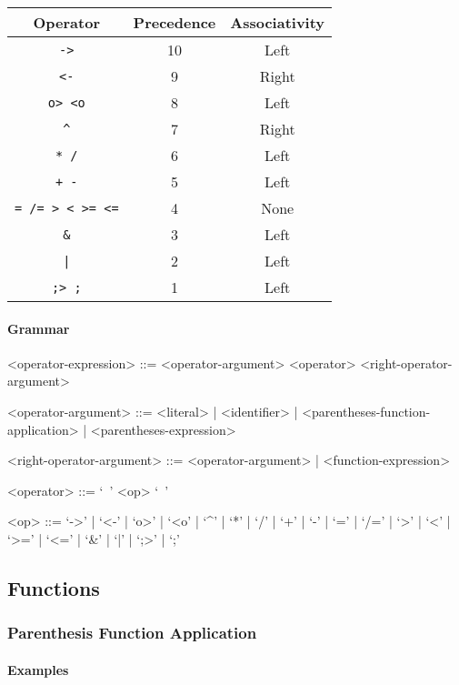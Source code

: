 \documentclass{article}
\begin{document}
\begin{center}
\begin{tabular}{ |c|c|c| } 
\hline
Operator & Precedence & Associativity \\ 
\hline
\hline
\texttt{->} & 10 & Left \\
\hline
\texttt{<-} & 9 & Right \\
\hline
\texttt{o> <o} & 8 & Left \\
\hline
\texttt{\^} & 7 & Right \\
\hline
\texttt{* /} & 6 & Left \\
\hline
\texttt{+ -} & 5 & Left \\ 
\hline
\texttt{= /= > < >= <=} & 4 & None \\
\hline
\texttt{\&} & 3 & Left \\
\hline
\texttt{|} & 2 & Left \\
\hline
\texttt{;> ;} & 1 & Left \\
\hline
\end{tabular}
\end{center}

\paragraph{Grammar}
\begin{grammar}
<operator-expression> ::= <operator-argument> <operator> <right-operator-argument>

<operator-argument> ::=
<literal> | <identifier> | <parentheses-function-application> |
<parentheses-expression>

<right-operator-argument> ::= <operator-argument> | <function-expression>

<operator> ::= `\ ' <op> `\ '

<op> ::= 
`->' | `<-' | `o>' | `<o' | `^' | `*' | `/' | `+' | `-' |
`=' | `/=' | `>' | `<' | `>=' | `<=' | `\&' | `|' | `;>' | `;'
\end{grammar}

\subsection{Functions}
\subsubsection{Parenthesis Function Application}
\label{subsec:parenfuncapp}

\paragraph{Examples}
\end{document}
